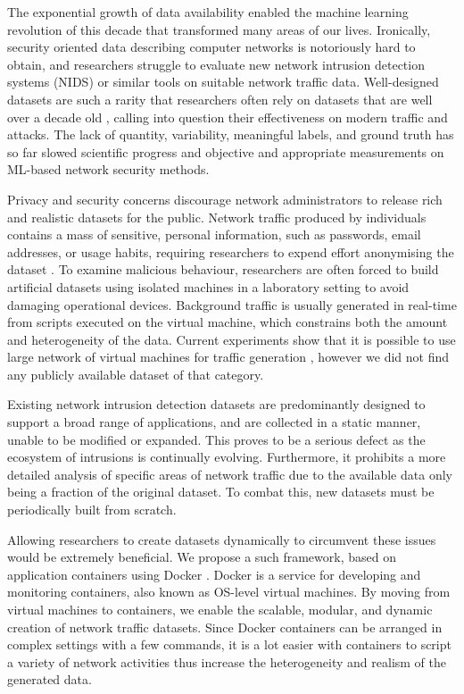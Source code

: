 \documentclass[sigconf]{acmart}
\begin{document}
The exponential growth of data availability enabled the machine learning revolution of this decade that transformed many areas of our lives. Ironically, security oriented data describing computer networks is notoriously hard to obtain, and researchers struggle to evaluate new network intrusion detection systems (NIDS) or similar tools on suitable network traffic data.
Well-designed datasets are such a rarity that researchers often rely on datasets that are well over a decade old \cite{tavallaee2009detailed, kayacik2005selecting}, calling into question their effectiveness on modern traffic and attacks. The lack of quantity, variability, meaningful labels, and ground truth has so far slowed scientific progress and objective and appropriate measurements on ML-based network security methods.


Privacy and security concerns discourage network administrators to release rich and realistic datasets for the public. Network traffic produced by individuals contains a mass of sensitive, personal information, such as passwords, email addresses, or usage habits, requiring researchers to expend effort anonymising the dataset \cite{mirsky2016sherlock}. To examine malicious behaviour, researchers are often forced to build artificial datasets using isolated machines in a laboratory setting to avoid damaging operational devices. Background traffic is usually generated in real-time from scripts executed on the virtual machine, which constrains both the amount and heterogeneity of the data. Current experiments show that it is possible to use large network of virtual machines for traffic generation \cite{crussell2019lessons,crussell2019virtually}, however we did not find any publicly available dataset of that category. 

Existing network intrusion detection datasets are predominantly designed to support a broad range of applications, and are collected in a static manner, unable to be modified or expanded. This proves to be a serious defect as the ecosystem of intrusions is continually evolving.
Furthermore, it prohibits a more detailed analysis of specific areas of network traffic due to the available data only being a fraction of the original dataset. To combat this, new datasets must be periodically built from scratch.

Allowing researchers to create datasets dynamically to circumvent these issues would be extremely beneficial. We propose a such framework, based on application containers using Docker \cite{docker}. Docker is a service for developing and monitoring containers, also known as OS-level virtual machines. 
By moving from virtual machines to containers, we enable the scalable, modular, and dynamic creation of network traffic datasets. Since Docker containers can be arranged in complex settings with a few commands, it is a lot easier with containers to script a variety of network activities thus increase the heterogeneity and realism of the generated data.
\end{document}
